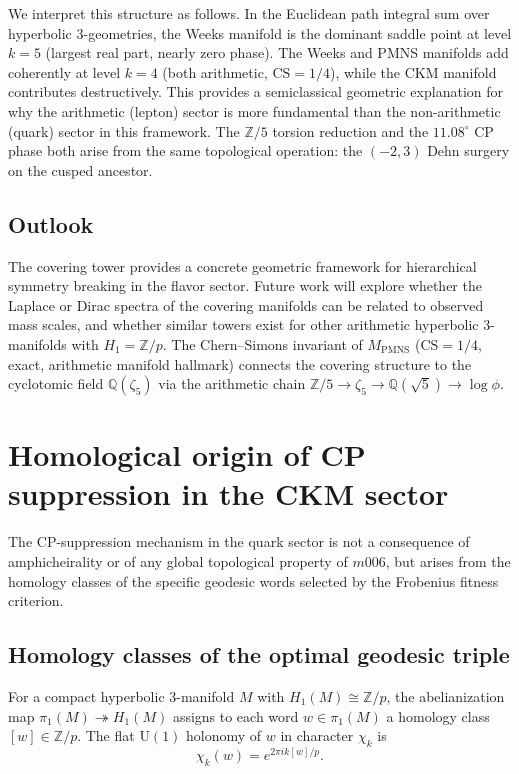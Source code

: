 ﻿\documentclass[12pt]{article}
\theoremstyle{definition}
\begin{document}
We interpret this structure as follows.
In the Euclidean path integral sum over hyperbolic 3-geometries,
the Weeks manifold is the dominant saddle point at level $k=5$
(largest real part, nearly zero phase).
The Weeks and PMNS manifolds add coherently at level $k=4$
(both arithmetic, $\mathrm{CS}=1/4$), while the CKM manifold
contributes destructively.
This provides a semiclassical geometric explanation for why the
arithmetic (lepton) sector is more fundamental than the
non-arithmetic (quark) sector in this framework.
The $\mathbb{Z}/5$ torsion reduction and the $11.08^\circ$ CP phase
both arise from the same topological operation: the $(-2,3)$
Dehn surgery on the cusped ancestor.


\subsection{Outlook}

The covering tower provides a concrete geometric framework for
hierarchical symmetry breaking in the flavor sector. Future work
will explore whether the Laplace or Dirac spectra of the covering
manifolds can be related to observed mass scales, and whether
similar towers exist for other arithmetic hyperbolic 3-manifolds
with $H_1=\mathbb{Z}/p$. The Chern--Simons invariant of $M_\text{PMNS}$
($\mathrm{CS}=1/4$, exact, arithmetic manifold hallmark) connects
the covering structure to the cyclotomic field
$\mathbb{Q}(\zeta_5)$ via the arithmetic chain
$\mathbb{Z}/5\to\zeta_5\to\mathbb{Q}(\sqrt{5})\to\log\phi$.


\section{Homological origin of CP suppression in the CKM sector}
\label{sec:homological_cp}

The CP-suppression mechanism in the quark sector is not a consequence
of amphicheirality or of any global topological property of $m006$,
but arises from the homology classes of the specific geodesic words
selected by the Frobenius fitness criterion.

\subsection{Homology classes of the optimal geodesic triple}

For a compact hyperbolic 3-manifold $M$ with $H_1(M)\cong\mathbb{Z}/p$,
the abelianization map $\pi_1(M)\twoheadrightarrow H_1(M)$ assigns to
each word $w\in\pi_1(M)$ a homology class $[w]\in\mathbb{Z}/p$.
The flat $\mathrm{U}(1)$ holonomy of $w$ in character $\chi_k$ is
\[
  \chi_k(w) = e^{2\pi i k [w]/p}.
\]
\end{document}
